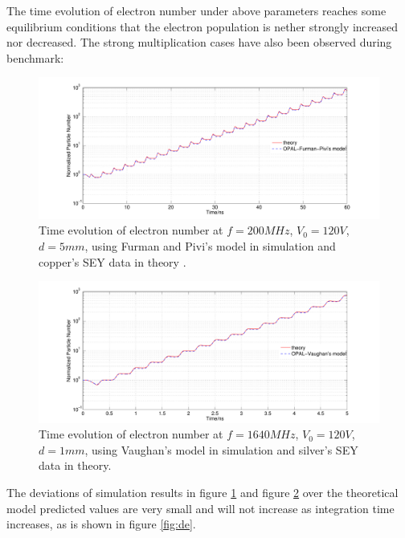 \documentclass[a4paper,11pt]{article}
\begin{document}
The time evolution of electron number under above parameters reaches some equilibrium conditions that the electron population is nether strongly increased nor decreased. The strong multiplication cases have also been observed during benchmark:
\begin{figure}[H]
\begin{center}
\includegraphics[width=1\textwidth]{copper_multi.pdf}
\end{center}
\caption{Time evolution of electron number at $f=200MHz$, $V_0=120V$, $d=5mm$, using Furman and Pivi's model in simulation and copper's SEY data in theory .\label{fig:multi_copper}}
\end{figure}
\begin{figure}[H]
\begin{center}
\includegraphics[width=1\textwidth]{silver_multi.pdf}
\end{center}
\caption{Time evolution of electron number at $f=1640MHz$, $V_0=120V$, $d=1mm$, using Vaughan's model in simulation and silver's SEY data in theory.\label{fig:multi_silver}}
\end{figure} 
The deviations of simulation results in figure \ref{fig:multi_copper} and figure \ref{fig:multi_silver} over the theoretical model predicted values are very small and will not increase as integration time increases, as is shown in figure \ref{fig:de}.
\end{document}
